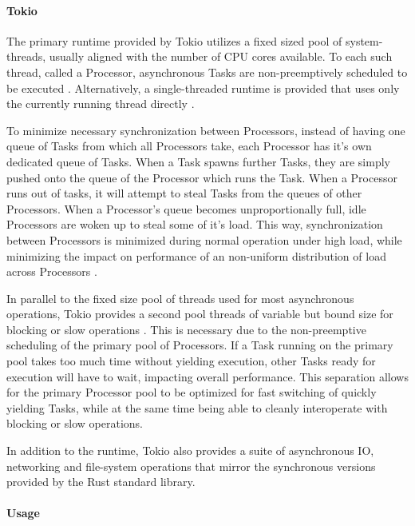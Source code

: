 \documentclass[a4paper,UKenglish,cleveref, autoref, thm-restate]{lipics-v2021}
\begin{document}
\paragraph*{Tokio}

The primary runtime provided by Tokio utilizes a fixed sized pool of system-threads, usually aligned with the number of CPU cores available. To each such thread, called a Processor, asynchronous Tasks are non-preemptively scheduled to be executed \cite{Makingth23:online}. Alternatively, a single-threaded runtime is provided that uses only the currently running thread directly \cite{tokioexe87:online}.

To minimize necessary synchronization between Processors, instead of having one queue of Tasks from which all Processors take, each Processor has it's own dedicated queue of Tasks. When a Task spawns further Tasks, they are simply pushed onto the queue of the Processor which runs the Task. When a Processor runs out of tasks, it will attempt to steal Tasks from the queues of other Processors. When a Processor's queue becomes unproportionally full, idle Processors are woken up to steal some of it's load. This way, synchronization between Processors is minimized during normal operation under high load, while minimizing the impact on performance of an non-uniform distribution of load across Processors \cite{Makingth23:online}.

In parallel to the fixed size pool of threads used for most asynchronous operations, Tokio provides a second pool threads of variable but bound size for blocking or slow operations \cite{AsyncRus83:online}. This is necessary due to the non-preemptive scheduling of the primary pool of Processors. If a Task running on the primary pool takes too much time without yielding execution, other Tasks ready for execution will have to wait, impacting overall performance. This separation allows for the primary Processor pool to be optimized for fast switching of quickly yielding Tasks, while at the same time being able to cleanly interoperate with blocking or slow operations.

In addition to the runtime, Tokio also provides a suite of asynchronous IO, networking and file-system operations that mirror the synchronous versions provided by the Rust standard library.

\paragraph*{Usage}
\end{document}
